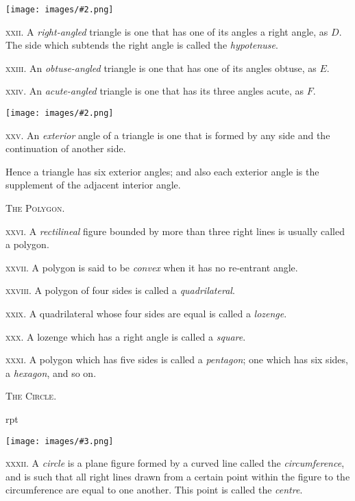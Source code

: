 \documentclass[oneside]{book}
\newcounter{wrapwidth}
\newcommand\imgflow[3]{
\setcounter{wrapwidth}{#1}
\begin{wrapfigure}[#2]{r}{\value{wrapwidth}pt}
\begin{center}
\vspace{-0.3in}
\texttt{[image: images/\#3.png]}
\end{center}
\end{wrapfigure}
}
\newcommand\imgcent[2]{
\begin{center}
\texttt{[image: images/\#2.png]}
\end{center}
}
\begin{document}
\imgcent{233}{f007}

\textsc{xxii}. A \textit{right-angled} triangle is one that has one of
its angles a right angle, as $D$. The side which subtends
the right angle is called the \textit{hypotenuse}.

\textsc{xxiii}. An \textit{obtuse-angled} triangle is one that has one
of its angles obtuse, as $E$.

\textsc{xxiv}. An \textit{acute-angled} triangle is one that has its three
angles acute, as $F$.

\imgcent{233}{f008}

\textsc{xxv}. An \textit{exterior} angle of a triangle is one that is
formed by any side and the continuation of another
side.

\begin{footnotesize}
Hence a triangle has six exterior angles; and also each exterior
angle is the supplement of the adjacent interior angle.
\par\end{footnotesize}


\begin{center}
\textsc{The Polygon.}
\end{center}

\textsc{xxvi}. A \textit{rectilineal} figure bounded by more than three
right lines is usually called a polygon.

\textsc{xxvii}. A polygon is said to be \textit{convex} when it has no
re-entrant angle.

\textsc{xxviii}. A polygon of four sides is called a \textit{quadrilateral}.

\textsc{xxix}. A quadrilateral whose four sides are equal is
called a \textit{lozenge}.

\textsc{xxx}. A lozenge which has a right angle is called a
\textit{square}.

\textsc{xxxi}. A polygon which has five sides is called a
\textit{pentagon}; one which has six sides, a \textit{hexagon}, and so on.


\begin{center}
\textsc{The Circle.}
\end{center}

\imgflow{95}{7}{f009}
\textsc{xxxii}. A \textit{circle} is a plane figure formed by a curved
line called the \textit{circumference}, and is
such that all right lines drawn
from a certain point within the
figure to the circumference are
equal to one another. This point
is called the \textit{centre}.
\end{document}
